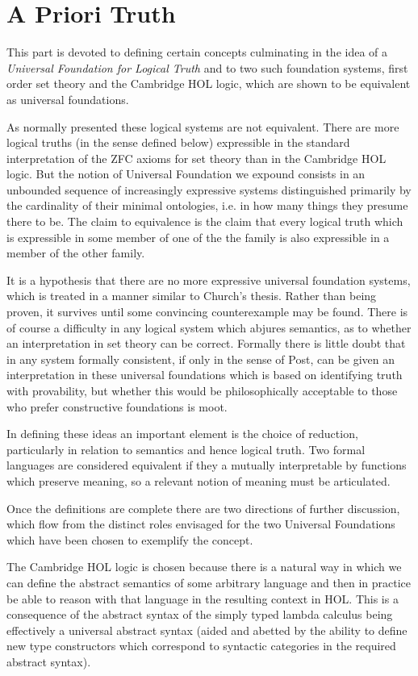 \documentclass[10pt,titlepage]{book}
\begin{document}
\chapter{A Priori Truth}

This part is devoted to defining certain concepts culminating in the idea of a \emph{Universal Foundation for Logical Truth} and to two such foundation systems, first order set theory and the Cambridge HOL logic, which are shown to be equivalent as universal foundations.

As normally presented these logical systems are not equivalent.
There are more logical truths (in the sense defined below) expressible in the standard interpretation of the ZFC axioms for set theory than in the Cambridge HOL logic.
But the notion of Universal Foundation we expound consists in an unbounded sequence of increasingly expressive systems distinguished primarily by the cardinality of their minimal ontologies, i.e. in how many things they presume there to be.
The claim to equivalence is the claim that every logical truth which is expressible in some member of one of the the family is also expressible in a member of the other family.

It is a hypothesis that there are no more expressive universal foundation systems, which is treated in a manner similar to Church's thesis.
Rather than being proven, it survives until some convincing counterexample may be found.
There is of course a difficulty in any logical system which abjures semantics, as to whether an interpretation in set theory can be correct.
Formally there is little doubt that in any system formally consistent, if only in the sense of Post, can be given an interpretation in these universal foundations which is based on identifying truth with provability, but whether this would be philosophically acceptable to those who prefer constructive foundations is moot.

In defining these ideas an important element is the choice of reduction, particularly in relation to semantics and hence logical truth.
Two formal languages are considered equivalent if they a mutually interpretable by functions which preserve meaning, so a relevant notion of meaning must be articulated.

Once the definitions are complete there are two directions of further discussion, which flow from the distinct roles envisaged for the two Universal Foundations which have been chosen to exemplify the concept.

The Cambridge HOL logic is chosen because there is a natural way in which we can define the abstract semantics of some arbitrary language and then in practice be able to reason with that language in the resulting context in HOL.
This is a consequence of the abstract syntax of the simply typed lambda calculus being effectively a universal abstract syntax (aided and abetted by the ability to define new type constructors which correspond to syntactic categories in the required abstract syntax).
\end{document}
